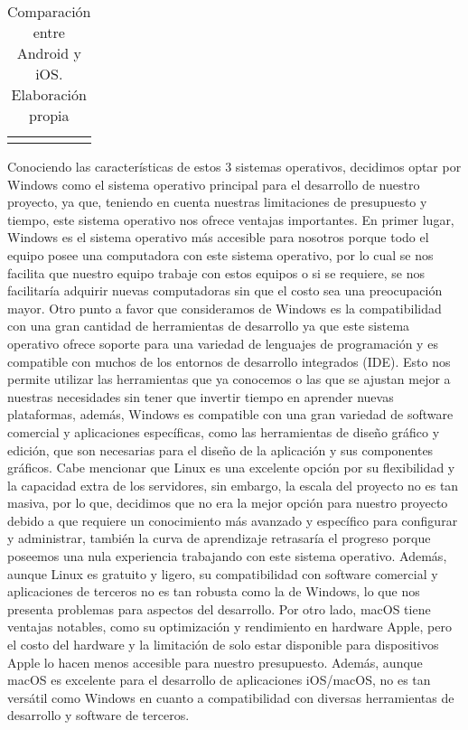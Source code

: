 \begin{longtable}{|p{3cm}|p{4.5cm}|p{4.5cm}|p{5cm}|}
    \hline
    
    \caption{Comparación entre Android y iOS. Elaboración propia}
    \label{tab:Tabla2}
    \end{longtable}

Conociendo las características de estos 3 sistemas operativos, decidimos optar por Windows como el sistema operativo principal para el desarrollo de nuestro proyecto, ya que, teniendo en cuenta nuestras limitaciones de presupuesto y tiempo, este sistema operativo nos ofrece ventajas importantes. En primer lugar, Windows es el sistema operativo más accesible para nosotros porque todo el equipo posee una computadora con este sistema operativo, por lo cual se nos facilita que nuestro equipo trabaje con estos equipos o si se requiere, se nos facilitaría adquirir nuevas computadoras sin que el costo sea una preocupación mayor.
Otro punto a favor que consideramos de Windows es la compatibilidad con una gran cantidad de herramientas de desarrollo ya que este sistema operativo ofrece soporte para una variedad de lenguajes de programación y es compatible con muchos de los entornos de desarrollo integrados (IDE). Esto nos permite utilizar las herramientas que ya conocemos o las que se ajustan mejor a nuestras necesidades sin tener que invertir tiempo en aprender nuevas plataformas, además, Windows es compatible con una gran variedad de software comercial y aplicaciones específicas, como las herramientas de diseño gráfico y edición, que son necesarias para el diseño de la aplicación y sus componentes gráficos.
Cabe mencionar que Linux es una excelente opción por su flexibilidad y la capacidad extra de los servidores, sin embargo, la escala del proyecto no es tan masiva, por lo que, decidimos que no era la mejor opción para nuestro proyecto debido a que requiere un conocimiento más avanzado y específico para configurar y administrar, también la curva de aprendizaje retrasaría el progreso porque poseemos una nula experiencia trabajando con este sistema operativo. Además, aunque Linux es gratuito y ligero, su compatibilidad con software comercial y aplicaciones de terceros no es tan robusta como la de Windows, lo que nos presenta problemas para aspectos del desarrollo.
Por otro lado, macOS tiene ventajas notables, como su optimización y rendimiento en hardware Apple, pero el costo del hardware y la limitación de solo estar disponible para dispositivos Apple lo hacen menos accesible para nuestro presupuesto. Además, aunque macOS es excelente para el desarrollo de aplicaciones iOS/macOS, no es tan versátil como Windows en cuanto a compatibilidad con diversas herramientas de desarrollo y software de terceros.

